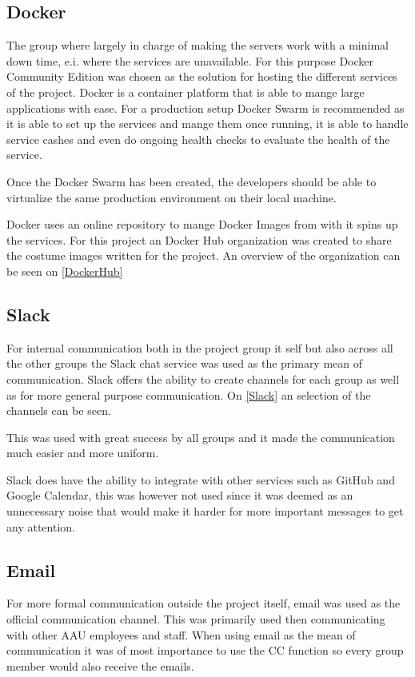 

\subsection{Docker}
The group where largely in charge of making the servers work with a minimal down time, e.i. where the services are unavailable.
For this purpose Docker Community Edition was chosen as the solution for hosting the different services of the project. 
Docker is a container platform that is able to mange large applications with ease. 
For a production setup Docker Swarm is recommended as it is able to set up the services and mange them once running, it is able to handle service cashes and even do ongoing health checks to evaluate the health of the service. 

Once the Docker Swarm has been created, the developers should be able to virtualize the same production environment on their local machine. 

Docker uses an online repository to mange Docker Images from with it spins up the services. 
For this project an Docker Hub organization was created to share the costume images written for the project. 
An overview of the organization can be seen on \autoref{DockerHub}


\subsection{Slack}
For internal communication both in the project group it self but also across all the other groups the Slack chat service was used as the primary mean of communication. 
Slack offers the ability to create channels for each group as well as for more general purpose communication. 
On \autoref{Slack} an selection of the channels can be seen. 


This was used with great success by all groups and it made the communication much easier and more uniform. 

Slack does have the ability to integrate with other services such as GitHub and Google Calendar, this was however not used since it was deemed as an unnecessary noise that would make it harder for more important messages to get any attention. 

\subsection{Email}
For more formal communication outside the project itself, email was used as the official communication channel. 
This was primarily used then communicating with other AAU employees and staff. 
When using email as the mean of communication it was of most importance to use the CC function so every group member would also receive the emails.
